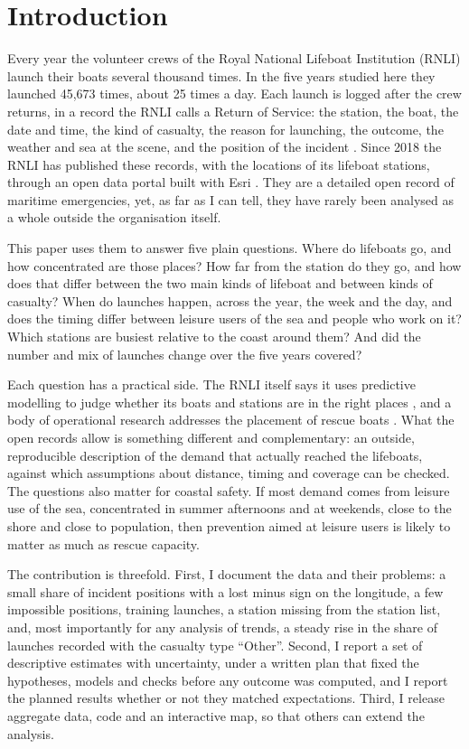 \documentclass[11pt,a4paper]{article}
\begin{document}
\section{Introduction}
Every year the volunteer crews of the Royal National Lifeboat Institution (RNLI) launch their boats several thousand times. In the five years studied here they launched 45,673 times, about 25 times a day. Each launch is logged after the crew returns, in a record the RNLI calls a Return of Service: the station, the boat, the date and time, the kind of casualty, the reason for launching, the outcome, the weather and sea at the scene, and the position of the incident \citep{wright2021}. Since 2018 the RNLI has published these records, with the locations of its lifeboat stations, through an open data portal built with Esri \citep{roberts2018,rnlidata}. They are a detailed open record of maritime emergencies, yet, as far as I can tell, they have rarely been analysed as a whole outside the organisation itself.

This paper uses them to answer five plain questions. Where do lifeboats go, and how concentrated are those places? How far from the station do they go, and how does that differ between the two main kinds of lifeboat and between kinds of casualty? When do launches happen, across the year, the week and the day, and does the timing differ between leisure users of the sea and people who work on it? Which stations are busiest relative to the coast around them? And did the number and mix of launches change over the five years covered?

Each question has a practical side. The RNLI itself says it uses predictive modelling to judge whether its boats and stations are in the right places \citep{wright2021}, and a body of operational research addresses the placement of rescue boats \citep{razi2016,akbari2018}. What the open records allow is something different and complementary: an outside, reproducible description of the demand that actually reached the lifeboats, against which assumptions about distance, timing and coverage can be checked. The questions also matter for coastal safety. If most demand comes from leisure use of the sea, concentrated in summer afternoons and at weekends, close to the shore and close to population, then prevention aimed at leisure users is likely to matter as much as rescue capacity.

The contribution is threefold. First, I document the data and their problems: a small share of incident positions with a lost minus sign on the longitude, a few impossible positions, training launches, a station missing from the station list, and, most importantly for any analysis of trends, a steady rise in the share of launches recorded with the casualty type ``Other''. Second, I report a set of descriptive estimates with uncertainty, under a written plan that fixed the hypotheses, models and checks before any outcome was computed, and I report the planned results whether or not they matched expectations. Third, I release aggregate data, code and an interactive map, so that others can extend the analysis.
\end{document}
